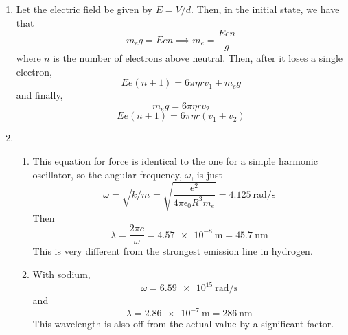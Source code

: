 \documentclass[10pt]{article}
\begin{document}
\begin{enumerate}
    \item
    Let the electric field be given by $E = V/d$. Then, in the initial state, we have that
    \begin{equation*}
        m_e g = E e n \implies m_e = \frac{E e n}{g}
    \end{equation*}
    where $n$ is the number of electrons above neutral. Then, after it loses a single electron,
    \begin{equation*}
        E e (n+1) = 6 \pi\eta r v_1 + m_e g
    \end{equation*}
    and finally,
    \begin{equation*}
        m_e g = 6\pi\eta r v_2
    \end{equation*}
    \begin{equation*}
        E e (n+1) = 6 \pi\eta r (v_1+v_2)
    \end{equation*}


    \item \begin{enumerate}
        \item This equation for force is identical to the one for a simple harmonic oscillator, so the angular frequency, $\omega$, is just
        \begin{equation*}
            \omega = \sqrt{k/m} = \sqrt{\frac{e^2}{4\pi\epsilon_0R^3 m_e}} = \SI{4.125}{\radian/\s}
        \end{equation*}
        Then
        \begin{equation*}
            \lambda = \frac{2\pi c}{\omega} = \SI{4.57e-8}{\meter} = \SI{45.7}{\nano\meter}
        \end{equation*}
        This is very different from the strongest emission line in hydrogen.


        \item With sodium,
        \begin{equation*}
            \omega = \SI{6.59e15}{\radian/\s}
        \end{equation*}
        and
        \begin{equation*}
            \lambda = \SI{2.86e-7}{\m} = \SI{286}{\nano\meter}
        \end{equation*}
        This wavelength is also off from the actual value by a significant factor.
    \end{enumerate}
  \end{enumerate}
\end{document}
